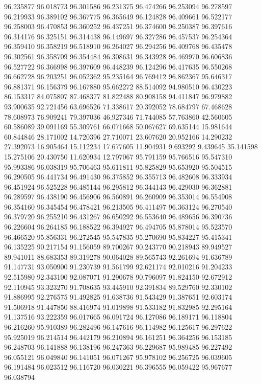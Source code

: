 96.235877
96.018773
96.301586
96.231375
96.474266
96.253094
96.278597
96.219933
96.389102
96.367775
96.365649
96.124828
96.409661
96.522177
96.258003
96.470853
96.360252
96.437251
96.374600
96.250387
96.397616
96.314176
96.325151
96.314438
96.149697
96.327286
96.457537
96.254364
96.359410
96.358219
96.518910
96.264027
96.294256
96.409768
96.435478
96.302561
96.358709
96.354484
96.308631
96.343928
96.469970
96.606836
96.527722
96.366998
96.397609
96.448239
96.124296
96.417635
96.550268
96.662728
96.203251
96.052362
95.235164
96.769412
96.862367
95.646317
96.881371
96.156379
96.167880
95.662272
88.514092
94.980510
96.430223
86.153317
84.075807
87.468377
81.822488
80.908158
94.411847
96.979882
93.900635
92.721456
63.696526
71.338617
20.392052
78.684797
67.468628
78.608973
76.909241
79.397036
46.927346
71.744085
57.763860
42.560605
60.586089
39.091169
55.309761
66.071668
50.067627
69.635144
15.981644
60.844846
28.171002
14.720396
27.710071
23.607620
20.952166
14.290232
27.392073
16.905464
15.112234
17.677605
11.904931
9.693292
9.439645
35.141598
15.275106
20.430750
11.620934
12.797067
95.791159
95.766516
95.547310
95.993386
96.038319
95.706463
95.611811
95.825829
95.653920
95.504515
96.290505
96.441734
96.491430
96.375852
96.355713
96.482608
96.333934
96.451924
96.525228
96.485144
96.295812
96.344143
96.429030
96.362881
96.289597
96.438190
96.456906
96.560891
96.260909
96.353014
96.554908
96.354160
96.345454
96.478421
96.213505
96.411497
96.363124
96.270540
96.379720
96.255210
96.431267
96.650292
96.553640
96.489656
96.390736
96.226604
96.264185
96.188522
96.394927
96.494705
95.878014
95.523570
96.466520
95.856331
96.272545
95.547835
95.270690
95.834227
95.415341
96.135225
90.217154
91.156059
89.700267
90.243770
90.218943
89.949527
89.941011
88.683353
89.319278
90.064028
89.565743
92.261694
91.636789
91.147731
93.050900
91.230739
91.561799
92.621174
92.010216
91.204233
92.515980
92.343100
92.087071
91.290678
90.796097
91.824150
92.672912
92.110945
93.323270
91.708635
93.445910
92.391834
89.529760
92.330102
91.886995
92.276575
91.492825
91.638736
91.543429
91.387651
92.603174
91.506918
91.447850
88.416974
91.019898
91.533182
91.832985
92.295164
91.137516
93.222359
96.017665
96.091724
96.127086
96.189171
96.118804
96.216260
95.910389
96.282496
96.147616
96.114982
96.125617
96.297622
95.925019
96.214514
96.442179
96.210894
96.161251
96.364256
96.153185
96.248703
96.141888
96.138196
96.247363
96.229687
95.989485
96.227492
96.055121
96.049840
96.141051
96.071267
95.978102
96.256725
96.039605
96.191484
96.023512
96.116720
96.030221
96.396555
96.059422
95.967677
96.038794

